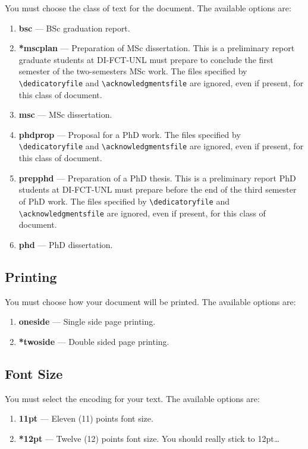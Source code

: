 You must choose the class of text for the document. The available options are:

\begin{enumerate}
	\item \textbf{bsc} --- BSc graduation report.
	\item \textbf{*mscplan} --- Preparation of MSc dissertation. This is a preliminary report graduate students at DI-FCT-UNL must prepare to conclude the first semester of the two-semesters MSc work. The files specified by \verb!\dedicatoryfile! and \verb!\acknowledgmentsfile! are ignored, even if present, for this class of document.
	\item \textbf{msc} --- MSc dissertation.
	\item \textbf{phdprop} ---  Proposal for a PhD work. The files specified by \verb!\dedicatoryfile! and \verb!\acknowledgmentsfile! are ignored, even if present, for this class of document.
	\item \textbf{prepphd} ---  Preparation of a PhD thesis. This is a preliminary report PhD students at DI-FCT-UNL must prepare before the end of the third semester of PhD work. The files specified by \verb!\dedicatoryfile! and \verb!\acknowledgmentsfile! are ignored, even if present, for this class of document.
	\item \textbf{phd} --- PhD dissertation.
\end{enumerate}

\subsection{Printing} %
\label{sub:printing}

You must choose how your document will be printed. The available options are:
\begin{enumerate}
	\item \textbf{oneside} --- Single side page printing.
	\item \textbf{*twoside} --- Double sided page printing.
\end{enumerate}

\subsection{Font Size} %
\label{ssec:font_size}

You must select the encoding for your text. The available options are:
\begin{enumerate}
	\item \textbf{11pt} --- Eleven (11) points font size.
	\item \textbf{*12pt} --- Twelve (12) points font size. You should really stick to 12pt\ldots
\end{enumerate}

